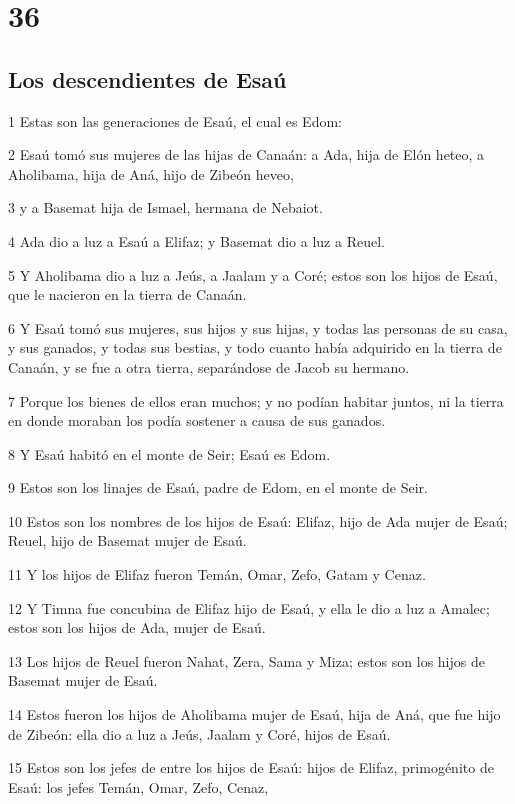 \chapter{36}

\section*{Los descendientes de Esaú}

\par 1 Estas son las generaciones de Esaú, el cual es Edom:
\par 2 Esaú tomó sus mujeres de las hijas de Canaán: a Ada, hija de Elón heteo, a Aholibama, hija de Aná, hijo de Zibeón heveo,
\par 3 y a Basemat hija de Ismael, hermana de Nebaiot.
\par 4 Ada dio a luz a Esaú a Elifaz; y Basemat dio a luz a Reuel.
\par 5 Y Aholibama dio a luz a Jeús, a Jaalam y a Coré; estos son los hijos de Esaú, que le nacieron en la tierra de Canaán.
\par 6 Y Esaú tomó sus mujeres, sus hijos y sus hijas, y todas las personas de su casa, y sus ganados, y todas sus bestias, y todo cuanto había adquirido en la tierra de Canaán, y se fue a otra tierra, separándose de Jacob su hermano.
\par 7 Porque los bienes de ellos eran muchos; y no podían habitar juntos, ni la tierra en donde moraban los podía sostener a causa de sus ganados.
\par 8 Y Esaú habitó en el monte de Seir; Esaú es Edom.
\par 9 Estos son los linajes de Esaú, padre de Edom, en el monte de Seir.
\par 10 Estos son los nombres de los hijos de Esaú: Elifaz, hijo de Ada mujer de Esaú; Reuel, hijo de Basemat mujer de Esaú.
\par 11 Y los hijos de Elifaz fueron Temán, Omar, Zefo, Gatam y Cenaz.
\par 12 Y Timna fue concubina de Elifaz hijo de Esaú, y ella le dio a luz a Amalec; estos son los hijos de Ada, mujer de Esaú.
\par 13 Los hijos de Reuel fueron Nahat, Zera, Sama y Miza; estos son los hijos de Basemat mujer de Esaú.
\par 14 Estos fueron los hijos de Aholibama mujer de Esaú, hija de Aná, que fue hijo de Zibeón: ella dio a luz a Jeús, Jaalam y Coré, hijos de Esaú.
\par 15 Estos son los jefes de entre los hijos de Esaú: hijos de Elifaz, primogénito de Esaú: los jefes Temán, Omar, Zefo, Cenaz,
